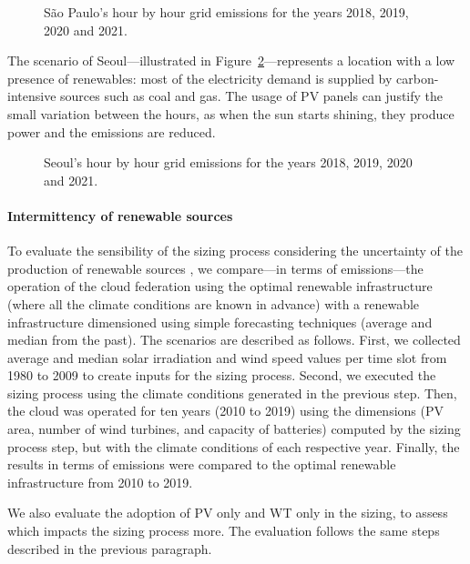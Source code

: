 \begin{figure}[h]
  \centering
  {}
  \caption{São Paulo's hour by hour grid emissions for the years 2018, 2019, 2020 and 2021.}
  \label{fig:co2_sp}
\end{figure}

The scenario of Seoul---illustrated in Figure~\ref{fig:co2_seoul}---represents a location with a low presence of renewables: most of the electricity demand is supplied by carbon-intensive sources such as coal and gas. The usage of PV panels can justify the small variation between the hours, as when the sun starts shining, they produce power and the emissions are reduced.

\begin{figure}[h]
  \centering
  {}
  \caption{Seoul's hour by hour grid emissions for the years 2018, 2019, 2020 and 2021.}
  \label{fig:co2_seoul}
\end{figure}

\paragraph{Intermittency of renewable sources}

To evaluate the sensibility of the sizing process considering the uncertainty of the production of renewable sources , we compare---in terms of  emissions---the operation of the cloud federation using the optimal renewable infrastructure (where all the climate conditions are known in advance) with a renewable infrastructure dimensioned using simple forecasting techniques (average and median from the past). The scenarios are described as follows. First, we collected average and median solar irradiation and wind speed values per time slot from 1980 to 2009 to create inputs for the sizing process. Second, we executed the sizing process using the climate conditions generated in the previous step. Then, the cloud was operated for ten years (2010 to 2019) using the dimensions (PV area, number of wind turbines, and capacity of batteries) computed by the sizing process step, but with the climate conditions of each respective year. Finally, the results in terms of  emissions were compared to the optimal renewable infrastructure from 2010 to 2019.

We also evaluate the adoption of PV only and WT only in the sizing, to assess which impacts the sizing process more. The evaluation follows the same steps described in the previous paragraph.

